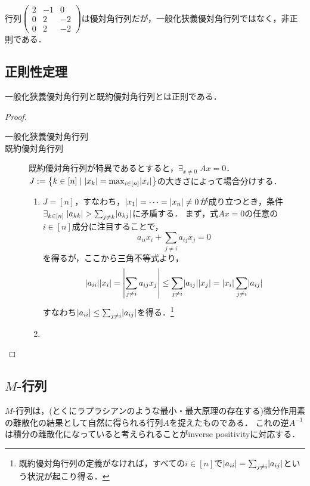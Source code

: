 \documentclass[uplatex, dvipdfmx]{jsreport}
\begin{document}
\begin{example}
    行列$\begin{pmatrix}2&-1&0\\0&2&-2\\0&2&-2\end{pmatrix}$は優対角行列だが，一般化狭義優対角行列ではなく，非正則である．
\end{example}

\subsection{正則性定理}

\begin{theorem}
    一般化狭義優対角行列と既約優対角行列とは正則である．
\end{theorem}
\begin{proof}\mbox{}
    \begin{description}
        \item[一般化狭義優対角行列] 
        
        \item[既約優対角行列] 
        既約優対角行列が特異であるとすると，$\exists_{x\ne 0}\;Ax=0$．
        $J:=\left\{k\in[n]\mid\lvert x_k\rvert=\max_{i\in[n]}\lvert x_i\rvert\right\}$の大きさによって場合分けする．
        \begin{enumerate}
            \item $J=[n]$，すなわち，$\lvert x_1\rvert=\cdots=\lvert x_n\rvert\ne0$が成り立つとき，条件$\exists_{k\in[n]}\;\lvert a_{kk}\rvert>\sum_{j\ne k}\lvert a_{kj}\rvert$に矛盾する．
            まず，式$Ax=0$の任意の$i\in[n]$成分に注目することで，
            \[a_{ii}x_i+\sum_{j\ne i}a_{ij}x_j=0\]
            を得るが，ここから三角不等式より，
            \[\lvert a_{ii}\rvert\lvert x_i\rvert=\left|\sum_{j\ne i}a_{ij}x_j\right|\le\sum_{j\ne i}\lvert a_{ij}\rvert\lvert x_j\rvert=\lvert x_i\rvert\sum_{j\ne i}\lvert a_{ij}\rvert\]
            すなわち$\lvert a_{ii}\rvert\le\sum_{j\ne i}\lvert a_{ij}\rvert$を得る．\footnote{既約優対角行列の定義がなければ，すべての$i\in[n]$で$\lvert a_{ii}\rvert=\sum_{j\ne i}\lvert a_{ij}\rvert$という状況が起こり得る．}
            \item 
        \end{enumerate}
    \end{description}
\end{proof}

\subsection{$M$-行列}

\begin{tcolorbox}[colframe=ForestGreen, colback=ForestGreen!10!white,breakable,colbacktitle=ForestGreen!40!white,coltitle=black,fonttitle=\bfseries\sffamily,
title=]
    $M$-行列は，(とくにラプラシアンのような最小・最大原理の存在する)微分作用素の離散化の結果として自然に得られる行列$A$を捉えたものである．
    これの逆$A^{-1}$は積分の離散化になっていると考えられることがinverse positivityに対応する．
\end{tcolorbox}
\end{document}
